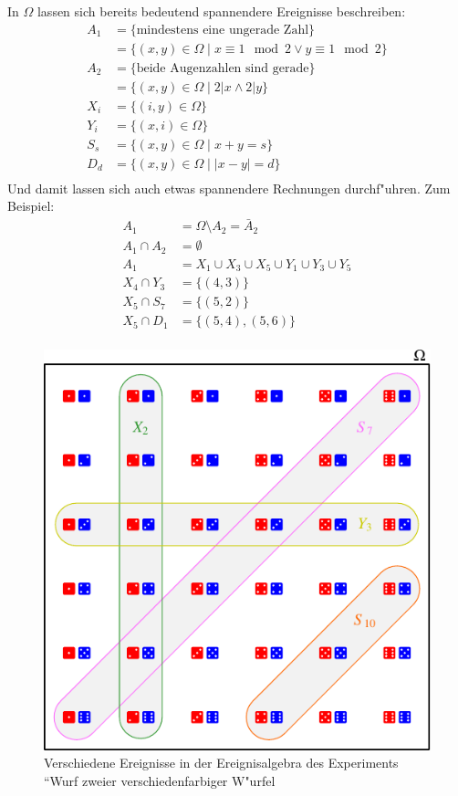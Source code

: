In $\Omega$ lassen sich bereits bedeutend spannendere Ereignisse
beschreiben:
\begin{align*}
A_1&=\{\text{mindestens eine ungerade Zahl}\}\\
   &=\{(x,y)\in\Omega\;|\;x \equiv 1\mod 2 \vee y\equiv 1\mod 2\}\\
A_2&=\{\text{beide Augenzahlen sind gerade}\}\\
   &=\{(x,y)\in\Omega\;|\;2|x \wedge 2|y\}\\
X_i&=\{(i,y)\in\Omega\}\\
Y_i&=\{(x,i)\in\Omega\}\\
S_s&=\{(x,y)\in\Omega\;|\; x + y = s\}\\
D_d&=\{(x,y)\in\Omega\;|\; |x - y| = d\}\\
\end{align*}
Und damit lassen sich auch etwas spannendere Rechnungen durchf"uhren.
Zum Beispiel:
\begin{align*}
A_1&=\Omega \setminus A_2 = \bar A_2\\
A_1\cap A_2&=\emptyset\\
A_1&=X_1\cup X_3 \cup X_5\cup Y_1\cup Y_3\cup Y_5\\
X_4\cap Y_3&=\{(4,3)\}\\
X_5\cap S_7&=\{(5,2)\}\\
X_5\cap D_1&=\{(5,4), (5,6)\}\\
\end{align*}
\begin{figure}
\centering
\includegraphics{images/zweiwuerfel-1.pdf}
\caption{Verschiedene Ereignisse in der Ereignisalgebra des Experiments
``Wurf zweier verschiedenfarbiger W"urfel\label{zweiwuerfel}}
\end{figure}

